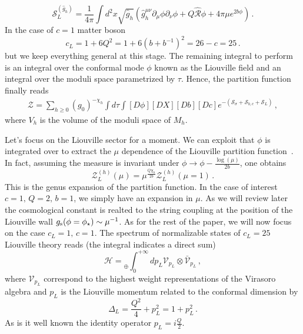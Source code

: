 \documentclass[a4paper]{article}
\begin{document}
\begin{equation}
  \mathcal{S}^{(\hat{g}_h)}_{L}=\frac{1}{4\pi}\int d^2x \sqrt{\hat{g}_h}\left(\hat{g}^{\mu \nu}_h \partial_\mu \phi \partial_\nu \phi +Q \hat{\mathcal{R}}\phi+4\pi\mu e^{2b\phi}\right)\,.
\end{equation}
In the case of $c=1$ matter boson 
\begin{equation}
    c_L = 1+6Q^2 = 1+ 6(b+b^{-1})^2 = 26-c = 25\,.
\end{equation}
but we keep everything general at this stage. The remaining integral to perform is an integral over the conformal mode $\phi$ known as the Liouville field and an integral over the moduli space parametrized by $\tau$. Hence, the partition function finally reads
\begin{equation}\label{eq:finalgaugefixing}
  \begin{aligned}
    \mathcal{Z} = \sum _{h\geq0} (g_0)^{-\chi_h} \int d\tau \int [D\phi][DX][Db][Dc]e^{-(\mathcal{S}_{\sigma}+\mathcal{S}_{b,c}+\mathcal{S}_{L})}\,,
  \end{aligned}
\end{equation}
where $V_{h}$ is the volume of the moduli space of $M_h$. 

Let's focus on the Liouville sector for a moment. We can exploit that $\phi$ is integrated over to extract the $\mu$ dependence of the Liouville partition function~\cite{martinec2004matrixmodels2dstring}. In fact, assuming the measure is invariant under $\phi \rightarrow \phi -\frac{\log(\mu)}{2b}$, one obtains
\begin{equation}\label{eq:KPZ}
  \mathcal{Z}^{(h)}_L(\mu) = \mu^{\frac{Q\chi_h}{2b}}\mathcal{Z}^{(h)}_L(\mu = 1)\,.
\end{equation}
This is the genus expansion of the partition function. In the case of interest $c=1,\,Q=2,\,b=1$, we simply have an expansion in $\mu$. As we will review later the cosmological constant is realted to the string coupling at the position of the Liouville wall $g_{\rm{s}}(\phi = \phi_\star) \sim \mu^{-1}$. As for the rest of the paper, we will now focus on the case $c_L=1,\,c=1$. The spectrum of normalizable states of $c_L = 25$ Liouville theory reads (the integral indicates a direct sum)
\begin{equation}
    \mathcal{H} = \underset{\oplus}{}\int_0^{+\infty} dp_L \mathcal{V}_{p_L} \otimes \bar{\mathcal{V}}_{p_L}\,,
\end{equation}
where $\mathcal{V}_{p_L}$ correspond to the highest weight representations of the Virasoro algebra and $p_L$ is the Liouville momentum related to the conformal dimension by
\begin{equation}
    \Delta_L = \frac{Q^2}{4}+p_L^2 = 1 +p_L^2\,.
\end{equation}
As is it well known the identity operator $p_L=i\frac{Q}{2}$.
\end{document}
